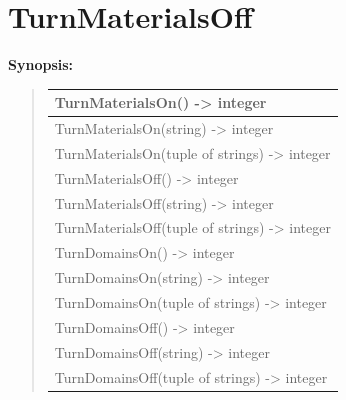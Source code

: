 \documentclass[letterpaper,10pt,english]{sphinxmanual}
\begin{document}
\section{TurnMaterialsOff}
\label{functions:turnmaterialsoff}
\begin{DUlineblock}{0em}
\item[] \textbf{Synopsis:}
\end{DUlineblock}
\begin{quote}

\begin{tabulary}{\linewidth}{|L|}
\hline

TurnMaterialsOn() -\textgreater{} integer
\\
\hline
TurnMaterialsOn(string) -\textgreater{} integer
\\
\hline
TurnMaterialsOn(tuple of strings) -\textgreater{} integer
\\
\hline
TurnMaterialsOff() -\textgreater{} integer
\\
\hline
TurnMaterialsOff(string) -\textgreater{} integer
\\
\hline
TurnMaterialsOff(tuple of strings) -\textgreater{} integer
\\
\hline
TurnDomainsOn() -\textgreater{} integer
\\
\hline
TurnDomainsOn(string) -\textgreater{} integer
\\
\hline
TurnDomainsOn(tuple of strings) -\textgreater{} integer
\\
\hline
TurnDomainsOff() -\textgreater{} integer
\\
\hline
TurnDomainsOff(string) -\textgreater{} integer
\\
\hline
TurnDomainsOff(tuple of strings) -\textgreater{} integer
\\
\hline\end{tabulary}

\end{quote}
\end{document}
